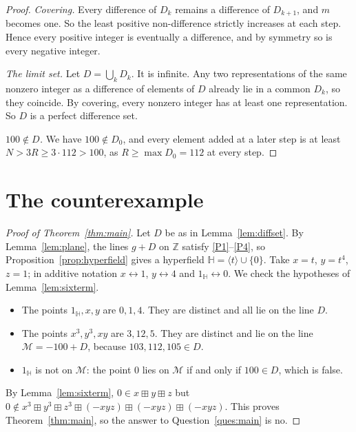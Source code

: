 \documentclass[11pt]{article}
\theoremstyle{definition}
\theoremstyle{remark}
\newcommand{\HH}{\mathbb{H}}
\newcommand{\Z}{\mathbb{Z}}
\newcommand{\bp}{\boxplus}
\begin{document}
\begin{proof}
\emph{Covering.} Every difference of $D_k$ remains a difference of $D_{k+1}$, and $m$ becomes one. So the least positive non-difference strictly increases at each step. Hence every positive integer is eventually a difference, and by symmetry so is every negative integer.

\emph{The limit set.} Let $D=\bigcup_k D_k$. It is infinite. Any two representations of the same nonzero integer as a difference of elements of $D$ already lie in a common $D_k$, so they coincide. By covering, every nonzero integer has at least one representation. So $D$ is a perfect difference set.

\emph{$100\notin D$.} We have $100\notin D_0$, and every element added at a later step is at least $N>3R\ge3\cdot112>100$, as $R\ge\max D_0=112$ at every step.
\end{proof}

\section{The counterexample}

\begin{proof}[Proof of Theorem~\ref{thm:main}]
Let $D$ be as in Lemma~\ref{lem:diffset}. By Lemma~\ref{lem:plane}, the lines $g+D$ on $\Z$ satisfy \ref{P1}--\ref{P4}, so Proposition~\ref{prop:hyperfield} gives a hyperfield $\HH=\langle t\rangle\cup\{0\}$. Take $x=t$, $y=t^4$, $z=1$; in additive notation $x\leftrightarrow1$, $y\leftrightarrow4$ and $1_{\HH}\leftrightarrow0$. We check the hypotheses of Lemma~\ref{lem:sixterm}.
\begin{itemize}[nosep]
\item The points $1_{\HH},x,y$ are $0,1,4$. They are distinct and all lie on the line $D$.
\item The points $x^3,y^3,xy$ are $3,12,5$. They are distinct and lie on the line $\mathcal M=-100+D$, because $103,112,105\in D$.
\item $1_{\HH}$ is not on $\mathcal M$: the point $0$ lies on $\mathcal M$ if and only if $100\in D$, which is false.
\end{itemize}
By Lemma~\ref{lem:sixterm}, $0\in x\bp y\bp z$ but $0\notin x^3\bp y^3\bp z^3\bp(-xyz)\bp(-xyz)\bp(-xyz)$. This proves Theorem~\ref{thm:main}, so the answer to Question~\ref{ques:main} is no.
\end{proof}
\end{document}
